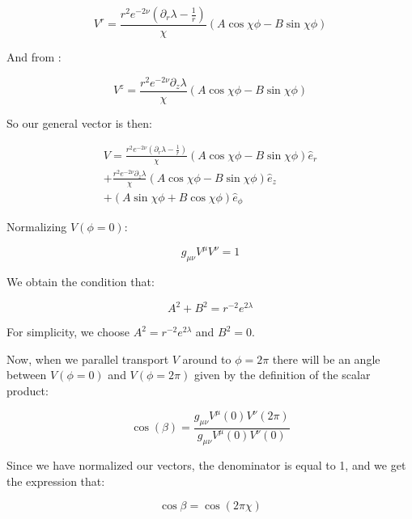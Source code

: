 \documentclass[12pt]{article}
\begin{document}
\begin{appendices}
\begin{equation}
V^{r}=\frac{r^2e^{-2\nu}(\partial_r\lambda-\frac{1}{r})}{\chi}\left(A\cos\chi\phi-B\sin\chi\phi\right)
\end{equation}

And from :

\begin{equation}
V^{z}=\frac{r^2 e^{-2\nu}\partial_z\lambda}{\chi}\left(A\cos\chi\phi-B\sin\chi\phi\right)
\end{equation}

So our general vector is then:

\begin{equation}
\label{eq:V-from-par-transport}
\begin{split}
V=\frac{r^2e^{-2\nu}(\partial_r\lambda-\frac{1}{r})}{\chi}\left(A\cos\chi\phi-B\sin\chi\phi\right)\hat{e}_{r} \\
+\frac{r^2 e^{-2\nu}\partial_z\lambda}{\chi}\left(A\cos\chi\phi-B\sin\chi\phi\right)\hat{e}_{z} \\
+\left(A\sin\chi\phi+B\cos\chi\phi\right)\hat{e}_{\phi}
\end{split}
\end{equation}

Normalizing $V(\phi=0)$:

\begin{equation}
\label{eq:inner-product}
g_{\mu\nu}V^{\mu}V^{\nu}=1
\end{equation}

We obtain the condition that:

\begin{equation}
A^2+B^2=r^{-2}e^{2\lambda}
\end{equation}

For simplicity, we choose $A^2=r^{-2}e^{2\lambda}$ and $B^2=0$. 

Now, when we parallel transport $V$ around to $\phi=2\pi$ there will be an angle between $V(\phi=0)$ and $V(\phi=2\pi)$ given by the definition of the scalar product:

\begin{equation}
\cos(\beta)=\frac{g_{\mu\nu}V^{\mu}(0)V^{\nu}(2\pi)}{g_{\mu\nu}V^{\mu}(0)V^{\nu}(0)}
\end{equation}

Since we have normalized our vectors, the denominator is equal to 1, and we get the expression that:

\begin{equation}
\cos\beta=\cos(2\pi\chi)
\end{equation}


\end{appendices}
\end{document}
